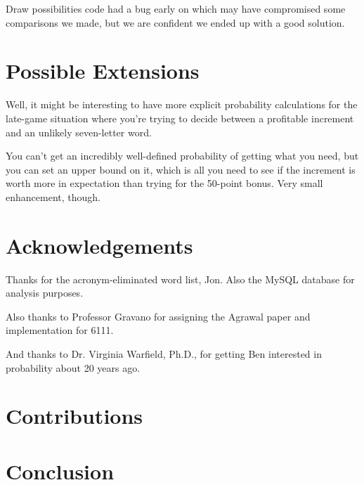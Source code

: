 \documentclass[11pt]{article}
\begin{document}
Draw possibilities code had a bug early on which may have compromised some comparisons we made, but we are confident we ended up with a good solution.

\section{Possible Extensions}

Well, it might be interesting to have more explicit probability calculations for the late-game situation where you're trying to decide between a profitable increment and an unlikely seven-letter word.

You can't get an incredibly well-defined probability of getting what you need, but you can set an upper bound on it, which is all you need to see if the increment is worth more in expectation than trying for the 50-point bonus.  Very small enhancement, though.



\section{Acknowledgements}

Thanks for the acronym-eliminated word list, Jon.  Also the MySQL database for analysis purposes.

Also thanks to Professor Gravano for assigning the Agrawal paper and implementation for 6111.

And thanks to Dr. Virginia Warfield, Ph.D., for getting Ben interested in probability about 20 years ago.

\section{Contributions}



\section{Conclusion}
\end{document}
